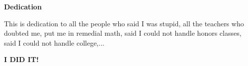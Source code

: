 
\begin{center}
    \textbf{Dedication}
\end{center}
This is dedication to all the people who said I was stupid, all the teachers who doubted me, put me in remedial math, said I could not handle honors classes, said I could not handle college,...
\begin{center}
\Large
\textbf{I DID IT!}     
\end{center}

\clearpage
